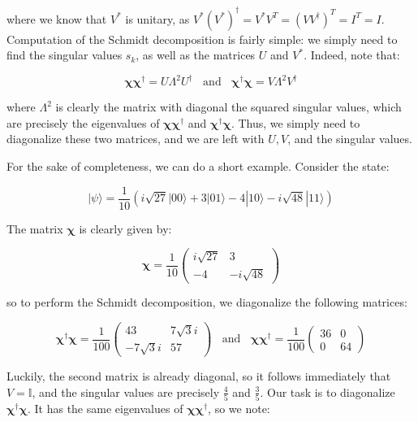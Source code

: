 \documentclass[
 10pt,
 amsmath,amssymb,
 notitlepage,
]{revtex4-1}
\begin{document}
where we know that $V^{*}$ is unitary, as $V^{*} (V^{*})^{\dagger} = V^{*} V^{T} = (V V^{\dagger})^{T} = I^{T} = I$. Computation of the Schmidt decomposition is fairly simple: we simply need to find the singular values $s_k$, as well as the matrices
$U$ and $V^{*}$. Indeed, note that:

$$\bm{\chi} \bm{\chi}^{\dagger} = U \Lambda^2 U^{\dagger} \ \ \ \ \text{and} \ \ \ \ \bm{\chi}^{\dagger} \bm{\chi} = V \Lambda^2 V^{\dagger}$$

where $\Lambda^2$ is clearly the matrix with diagonal the squared singular values, which are precisely the eigenvalues of $\bm{\chi} \bm{\chi}^{\dagger}$ and $\bm{\chi}^{\dagger} \bm{\chi}$. Thus,
we simply need to diagonalize these two matrices, and we are left with $U, V$, and the singular values.

\hrulefill

For the sake of completeness, we can do a short example. Consider the state:

$$|\psi\rangle = \frac{1}{10} \left( i\sqrt{27}|00\rangle + 3|01\rangle - 4|10\rangle - i\sqrt{48}|11\rangle \right)$$

The matrix $\bm{\chi}$ is clearly given by:

$$\bm{\chi} = \frac{1}{10} \begin{pmatrix} i\sqrt{27} & 3 \\ -4 & -i\sqrt{48} \end{pmatrix}$$

so to perform the Schmidt decomposition, we diagonalize the following matrices:

$$\bm{\chi}^{\dagger} \bm{\chi} = \frac{1}{100} \begin{pmatrix} 43 & 7\sqrt{3}i \\ -7\sqrt{3}i & 57 \end{pmatrix} \ \ \ \ \text{and} \ \ \ \ \bm{\chi} \bm{\chi}^{\dagger} = \frac{1}{100} \begin{pmatrix} 36 & 0 \\ 0 & 64 \end{pmatrix}$$

Luckily, the second matrix is already diagonal, so it follows immediately that $V = \mathbb{I}$, and the singular values are precisely $\frac{4}{5}$ and $\frac{3}{5}$. Our task is to diagonalize $\bm{\chi}^{\dagger} \bm{\chi}$. It has the same eigenvalues
of $\bm{\chi} \bm{\chi}^{\dagger}$, so we note:
\end{document}

